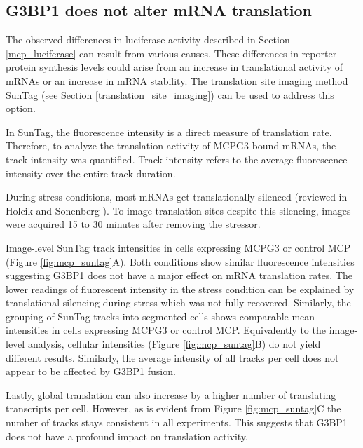 \subsection{G3BP1 does not alter mRNA translation}\label{mcp_suntag}

The observed differences in luciferase activity described in Section \ref{mcp_luciferase} can result from various causes.
These differences in reporter protein synthesis levels could arise from an increase in translational activity of mRNAs or an increase in mRNA stability.
The translation site imaging method SunTag (see Section \ref{translation_site_imaging}) can be used to address this option.

In SunTag, the fluorescence intensity is a direct measure of translation rate.
Therefore, to analyze the translation activity of MCPG3-bound mRNAs, the track intensity was quantified.
Track intensity refers to the average fluorescence intensity over the entire track duration.

During stress conditions, most mRNAs get translationally silenced (reviewed in Holcik and Sonenberg \cite{holcik_translational_2005}).
To image translation sites despite this silencing, images were acquired 15 to 30 minutes after removing the stressor.

Image-level SunTag track intensities in cells expressing MCPG3 or control MCP (Figure \ref{fig:mcp_suntag}A).
Both conditions show similar fluorescence intensities suggesting G3BP1 does not have a major effect on mRNA translation rates.
The lower readings of fluorescent intensity in the stress condition can be explained by translational silencing during stress which was not fully recovered.
Similarly, the grouping of SunTag tracks into segmented cells shows comparable mean intensities in cells expressing MCPG3 or control MCP.
Equivalently to the image-level analysis, cellular intensities (Figure \ref{fig:mcp_suntag}B) do not yield different results.
Similarly, the average intensity of all tracks per cell does not appear to be affected by G3BP1 fusion.

Lastly, global translation can also increase by a higher number of translating transcripts per cell.
However, as is evident from Figure \ref{fig:mcp_suntag}C the number of tracks stays consistent in all experiments.
This suggests that G3BP1 does not have a profound impact on translation activity.

